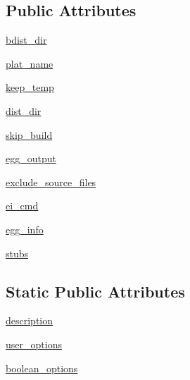 \subsection*{Public Attributes}
\begin{DoxyCompactItemize}
\item 
\hyperlink{classsetuptools_1_1command_1_1bdist__egg_1_1bdist__egg_a32b7373558697e1b843885ac1b9b9f80}{bdist\+\_\+dir}
\item 
\hyperlink{classsetuptools_1_1command_1_1bdist__egg_1_1bdist__egg_a6336ff216efe48ca45956611ed223888}{plat\+\_\+name}
\item 
\hyperlink{classsetuptools_1_1command_1_1bdist__egg_1_1bdist__egg_a2555cb62790306478e063514959fcca3}{keep\+\_\+temp}
\item 
\hyperlink{classsetuptools_1_1command_1_1bdist__egg_1_1bdist__egg_a4a93325179b5418e468b6e48c51edd65}{dist\+\_\+dir}
\item 
\hyperlink{classsetuptools_1_1command_1_1bdist__egg_1_1bdist__egg_abb9224020349f0490e768a1199ceb493}{skip\+\_\+build}
\item 
\hyperlink{classsetuptools_1_1command_1_1bdist__egg_1_1bdist__egg_a2060988e40d8ddc08eb084f873170498}{egg\+\_\+output}
\item 
\hyperlink{classsetuptools_1_1command_1_1bdist__egg_1_1bdist__egg_af17758c4b939b1fa91b10db1eb02a179}{exclude\+\_\+source\+\_\+files}
\item 
\hyperlink{classsetuptools_1_1command_1_1bdist__egg_1_1bdist__egg_a76ba48a979a663a403e92d34fd5d0c28}{ei\+\_\+cmd}
\item 
\hyperlink{classsetuptools_1_1command_1_1bdist__egg_1_1bdist__egg_a280f35f1dcbc9775b6b8d802aa0c83f4}{egg\+\_\+info}
\item 
\hyperlink{classsetuptools_1_1command_1_1bdist__egg_1_1bdist__egg_aa7cc5f6bb0bea739aed5fa363eb3efd5}{stubs}
\end{DoxyCompactItemize}
\subsection*{Static Public Attributes}
\begin{DoxyCompactItemize}
\item 
\hyperlink{classsetuptools_1_1command_1_1bdist__egg_1_1bdist__egg_a8697fd396866171c390bbb6dac1703e1}{description}
\item 
\hyperlink{classsetuptools_1_1command_1_1bdist__egg_1_1bdist__egg_aad25491c0449256b2b6274d927227ff2}{user\+\_\+options}
\item 
\hyperlink{classsetuptools_1_1command_1_1bdist__egg_1_1bdist__egg_a97dab91c545bc7367d4a138caa7d48a9}{boolean\+\_\+options}
\end{DoxyCompactItemize}


